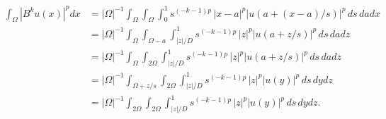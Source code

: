 \begin{align*}
    \int_{\Omega}
    \left| B^{k} u(x) \right|^{p}
    dx
    &
    = 
    |\Omega|^{-1}
    \int_{\Omega}
    \int_{\Omega} 
    \int_0^1
    s^{(-{k}-1)p}\, |x-a|^{p} \left| u\left( a+(x-a)/s \right) \right|^{p} \,ds\,da
    dx
    \\&
    = 
    |\Omega|^{-1}
    \int_{\Omega}
    \int_{\Omega-a} 
    \int_{|z|/D}^{1}
    s^{(-{k}-1)p}\, |z|^{p} \left| u\left( a+z/s \right) \right|^{p} \,ds\,da
    dz
    \\&
    = 
    |\Omega|^{-1}
    \int_{\Omega}
    \int_{2\Omega} 
    \int_{|z|/D}^{1}
    s^{(-{k}-1)p}\, |z|^{p} \left| u\left( a+z/s \right) \right|^{p} \,ds\,da
    dz
    \\&
    = 
    |\Omega|^{-1}
    \int_{\Omega + z/s}
    \int_{2\Omega} 
    \int_{|z|/D}^{1} %
    s^{(-{k}-1)p}\, |z|^{p} \left| u\left( y \right) \right|^{p} \,ds\,dy
    dz
    \\&
    = 
    |\Omega|^{-1}
    \int_{2\Omega}
    \int_{2\Omega} 
    \int_{|z|/D}^{1} %
    s^{(-{k}-1)p}\, |z|^{p} \left| u\left( y \right) \right|^{p} \,ds\,dy
    dz
    .
\end{align*}



